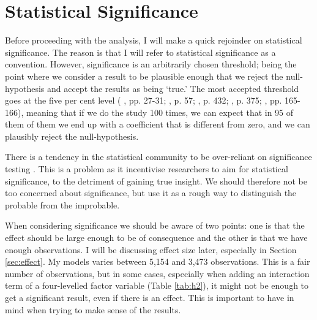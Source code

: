\section{Statistical Significance}
Before proceeding with the analysis, I will make a quick rejoinder on statistical significance. The reason is that I will refer to statistical significance as a convention. However, significance is an arbitrarily chosen threshold; being the point where we consider a result to be plausible enough that we reject the null-hypothesis and accept the results as being `true.' The most accepted threshold goes at the five per cent level (\citeauthor{christophersen_introduksjon_2018} \citeyear{christophersen_introduksjon_2018}, pp. 27-31; \citeauthor{gelman_regression_2021} \citeauthor{gelman_regression_2021}, p. 57; \citeauthor{halperin_political_2020} \citeyear{halperin_political_2020},  p. 432; \citeauthor{hellevik_forskningsmetode_2002} \citeyear{hellevik_forskningsmetode_2002}, p. 375; \citeauthor{kellstedt_fundamentals_2018} \citeyear{kellstedt_fundamentals_2018}, pp. 165-166), meaning that if we do the study 100 times, we can expect that in 95 of them of them we end up with a coefficient that is different from zero, and we can plausibly reject the null-hypothesis.

There is a tendency in the statistical community to be over-reliant on significance testing \citep{barnett_examination_2019, gelman_regression_2021, imbens_statistical_2021, van_zwet_significance_2021}. This is a problem as it incentivise researchers to aim for statistical significance, to the detriment of gaining true insight. We should therefore not be too concerned about significance, but use it as a rough way to distinguish the probable from the improbable.

When considering significance we should be aware of two points: one is that the effect should be large enough to be of consequence and the other is that we have enough observations. I will be discussing effect size later, especially in Section \ref{sec:effect}. My models varies between 5,154 and 3,473 observations. This is a fair number of observations, but in some cases, especially when adding an interaction term of a four-levelled factor variable (Table \ref{tab:h2}), it might not be enough to get a significant result, even if there is an effect. This is important to have in mind when trying to make sense of the results.




